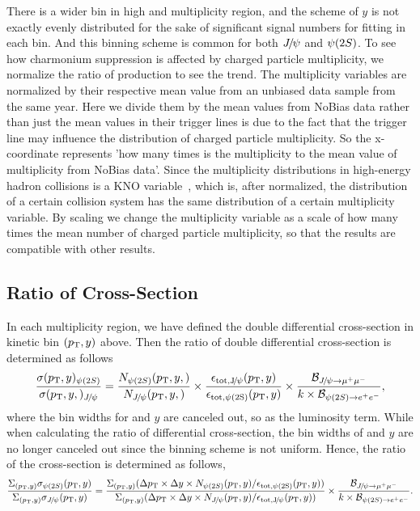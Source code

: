 There is a wider bin in high \pt and multiplicity region, and the scheme of $y$ is not exactly evenly distributed for the sake of significant signal numbers for fitting in each bin. And this binning scheme is common for both ${{J\mskip -3mu/\mskip -2mu\psi}}$ and ${\psi{(2S)}}$.
To see how charmonium suppression is affected by charged particle multiplicity, we normalize the ratio of production to see the trend. The multiplicity variables are normalized by their respective mean value from an unbiased data sample from the same year. Here we divide them by the mean values from NoBias data rather than just the mean values in their trigger lines is due to the fact that the trigger line may influence the distribution of charged particle multiplicity. So the x-coordinate represents 'how many times is the multiplicity to the mean value of multiplicity from NoBias data'. Since the multiplicity distributions in high-energy hadron collisions is a KNO variable~\cite {Koba:1972ng}, which is, after normalized, the distribution of a certain collision system has the same distribution of a certain multiplicity variable. By scaling we change the multiplicity variable as a scale of how many times the mean number of charged particle multiplicity, so that the results are compatible with other results.


\subsection{Ratio of Cross-Section}
In each multiplicity region, we have defined the double differential cross-section in kinetic bin $(p_{\mathrm{T}},y)$ above. 
Then the ratio of double differential cross-section is determined as follows
\begin{equation} 
    \frac{\sigma(p_{\mathrm{T}},y)_{{\psi{(2S)}}}}{\sigma(p_{\mathrm{T}},y,)_{{{J\mskip -3mu/\mskip -2mu\psi}}}} = 
    \frac{N_{{\psi{(2S)}}}(p_{\mathrm{T}},y,)}{N_{{{J\mskip -3mu/\mskip -2mu\psi}}}(p_{\mathrm{T}},y,)} \times
    \frac{\epsilon_{\mathrm{tot,{{J\mskip -3mu/\mskip -2mu\psi}}}}(p_{\mathrm{T}},y)} {\epsilon_{\mathrm{tot,{\psi{(2S)}}}}(p_{\mathrm{T}},y)} \times 
    \frac{\mathcal{B}_{{{J\mskip -3mu/\mskip -2mu\psi}} \rightarrow \mu^+ \mu^-}}{k\times \mathcal{B}_{{\psi{(2S)}}\rightarrow e^+e^-}},
    \label{Rsingle}
    \end{equation}
where the bin widths for \pt and $y$ are canceled out, so as the luminosity term. While when calculating the ratio 
of differential cross-section, the bin widths of \pt and $y$ are no longer canceled out since the binning scheme 
is not uniform. Hence, the ratio of the cross-section is determined as follows,
\begin{equation} 
    \frac{\Sigma_{(p_{\mathrm{T}},y)}\sigma_{{\psi{(2S)}}}(p_{\mathrm{T}},y)}{\Sigma_{(p_{\mathrm{T}},y)}\sigma_{{{J\mskip -3mu/\mskip -2mu\psi}}}(p_{\mathrm{T}},y)} = 
    \frac{\Sigma_{(p_{\mathrm{T}},y)}(\Delta p_{\mathrm{T}} \times \Delta y \times N_{{\psi{(2S)}}}(p_{\mathrm{T}},y) / \epsilon_{\mathrm{tot,{\psi{(2S)}}}}(p_{\mathrm{T}},y))}
    {\Sigma_{(p_{\mathrm{T}},y)}(\Delta p_{\mathrm{T}} \times \Delta y \times N_{{{J\mskip -3mu/\mskip -2mu\psi}}}(p_{\mathrm{T}},y) / \epsilon_{\mathrm{tot,{{J\mskip -3mu/\mskip -2mu\psi}}}}(p_{\mathrm{T}},y))} \times
    \frac{\mathcal{B}_{{{J\mskip -3mu/\mskip -2mu\psi}} \rightarrow \mu^+ \mu^-}}{k\times \mathcal{B}_{{\psi{(2S)}}\rightarrow e^+e^-}}.
\label{Rintegrated}
\end{equation}

